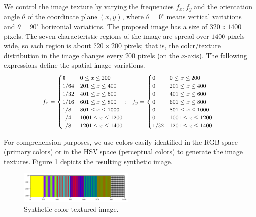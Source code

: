 \documentclass[journal]{IEEEtran}
\begin{document}
We control the image texture by varying the frequencies $f_{x}, f_{y}$ and the orientation angle $\theta$ of the coordinate plane $(x, y)$, where $\theta=0^\circ$ means vertical variations and $\theta=90^\circ$ horizontal variations. The proposed image has a size of $320\times1400$ pixels. The seven characteristic regions of the image are spread over $1400$ pixels wide, so each region is about $320\times200$ pixels; that is, the color/texture distribution in the image changes every 200 pixels (on the $x$-axis). The following expressions define the spatial image variations.  
\begin{gather}
	\medmath{f_{x} = 
	\begin{cases} 
      0    & 0\leq x\leq 200  \\
      1/64 & 201\leq x\leq 400  \\
      1/32 & 401\leq x\leq 600  \\
      1/16 & 601\leq x\leq 800  \\
      1/8  & 801\leq x\leq 1000  \\
      1/4  & 1001\leq x\leq 1200 \\   
      1/8  & 1201\leq x\leq 1400 \\ 
   	 \end{cases} \nonumber ; \quad
   	 f_{y} = \begin{cases} 
      0    & 0\leq x\leq 200  \\
      0    & 201\leq x\leq 400  \\
      0    & 401\leq x\leq 600  \\
      0    & 601\leq x\leq 800  \\
      0    & 801\leq x\leq 1000  \\
      0    & 1001\leq x\leq 1200 \\  
      1/32 & 1201\leq x\leq 1400 \\ 
   	 \end{cases}} \nonumber  
\end{gather}

For comprehension purposes, we use colors easily identified in the RGB space (primary colors) or in the HSV space (perceptual colors) to generate the image textures. Figure \ref{fig:synthetic_color_texture_image} depicts the resulting synthetic image. 

\begin{figure}[!ht]
    \includegraphics[width=0.5\textwidth]{synthetic_image_color_texture}
\caption{Synthetic color textured image.}\label{fig:synthetic_color_texture_image}
\end{figure}
\end{document}
